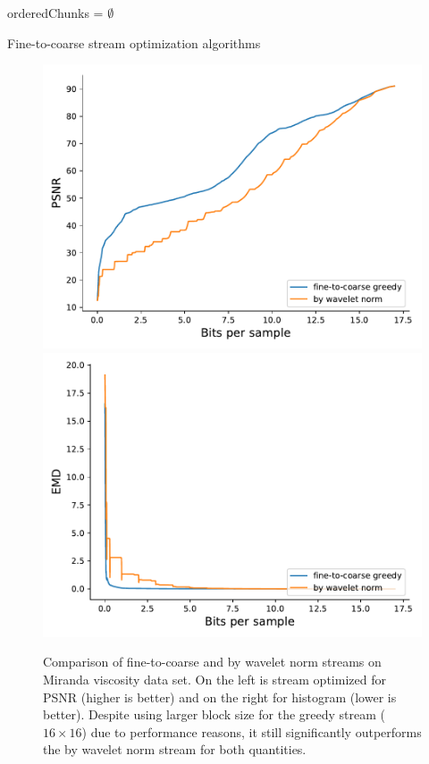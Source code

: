 \begin{algorithm}
  orderedChunks = $\emptyset$\;

  \caption{Fine-to-coarse stream optimization algorithms}
\end{algorithm}

\begin{figure}
        \centering
        \includegraphics[width=0.48\linewidth]{img/figure4_new/rmse-miranda-viscosity}
        \includegraphics[width=0.48\linewidth]{img/figure4_new/histogram-miranda-viscosity}
        \caption{Comparison of fine-to-coarse and by wavelet norm streams on Miranda viscosity data set.
                 On the left is stream optimized for PSNR (higher is better) and on the right for histogram (lower is better).
                 Despite using larger block size for the greedy stream ($16 \times 16$) due to performance reasons, it still
                 significantly outperforms the by wavelet norm stream for both quantities.}
\end{figure}



